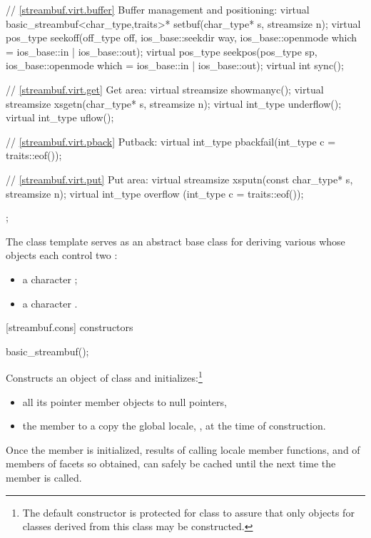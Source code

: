 \begin{codeblock}
{{    // \ref{streambuf.virt.buffer} Buffer management and positioning:
    virtual basic_streambuf<char_type,traits>*
         setbuf(char_type* s, streamsize n);
    virtual pos_type seekoff(off_type off, ios_base::seekdir way,
        ios_base::openmode which = ios_base::in | ios_base::out);
    virtual pos_type seekpos(pos_type sp,
        ios_base::openmode which = ios_base::in | ios_base::out);
    virtual int      sync();

    // \ref{streambuf.virt.get} Get area:
    virtual streamsize showmanyc();
    virtual streamsize xsgetn(char_type* s, streamsize n);
    virtual int_type   underflow();
    virtual int_type   uflow();

    // \ref{streambuf.virt.pback} Putback:
    virtual int_type   pbackfail(int_type c = traits::eof());

    // \ref{streambuf.virt.put} Put area:
    virtual streamsize xsputn(const char_type* s, streamsize n);
    virtual int_type   overflow (int_type c = traits::eof());
  };
}
\end{codeblock}

\pnum
The class template
serves as an abstract base class for deriving various
whose objects each control two
:
\begin{itemize}
\item
a character
;
\item
a character
.
\end{itemize}

[streambuf.cons]{ constructors}

%
\begin{itemdecl}
basic_streambuf();
\end{itemdecl}

\begin{itemdescr}
\pnum
\effects
Constructs an object of class
and initializes:\footnote{The default constructor is protected for class
to assure that only objects for classes
derived from this class may be constructed.}
\begin{itemize}
\item
all its pointer member objects to null pointers,
\item
the
member to a copy the global locale,
,
at the time of construction.
\end{itemize}

\pnum
\notes
Once the
member is initialized, results of calling locale member functions,
and of members of facets so obtained, can safely be cached until the
next time the member
is called.
\end{itemdescr}

